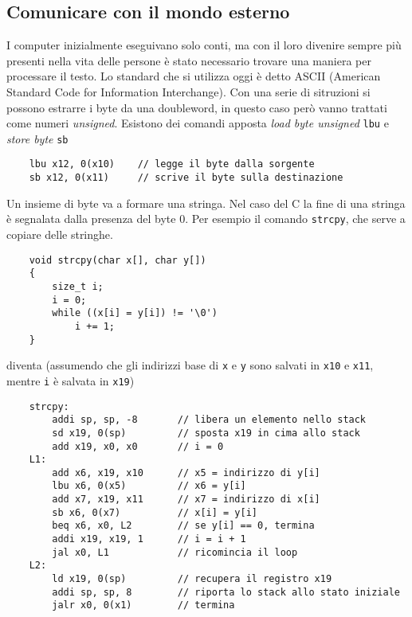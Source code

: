 \documentclass[a4paper,12pt]{article}
\theoremstyle{break}
\newcommand{\code}[1]{\texttt{#1}}
\numberwithin{equation}{section}
\begin{document}
\subsection{Comunicare con il mondo esterno}
I computer inizialmente eseguivano solo conti, ma con il loro divenire sempre più presenti nella vita delle persone è stato necessario trovare una maniera per processare il testo. Lo standard che si utilizza oggi è detto ASCII (American Standard Code for Information Interchange). Con una serie di sitruzioni si possono estrarre i byte da una doubleword, in questo caso però vanno trattati come numeri \textit{unsigned}. Esistono dei comandi apposta \textit{load byte unsigned} \code{lbu} e \textit{store byte} \code{sb}
\begin{verbatim}
    lbu x12, 0(x10)    // legge il byte dalla sorgente
    sb x12, 0(x11)     // scrive il byte sulla destinazione
\end{verbatim}
Un insieme di byte va a formare una stringa. Nel caso del C la fine di una stringa è segnalata dalla presenza del byte \(0\). 
Per esempio il comando \code{strcpy}, che serve a copiare delle stringhe.
\begin{verbatim}
    void strcpy(char x[], char y[])
    {
        size_t i;
        i = 0;
        while ((x[i] = y[i]) != '\0')
            i += 1;
    }
\end{verbatim}
diventa (assumendo che gli indirizzi base di \code{x} e \code{y} sono salvati in \code{x10} e \code{x11}, mentre \code{i} è salvata in \code{x19})
\begin{verbatim}
    strcpy:
        addi sp, sp, -8       // libera un elemento nello stack
        sd x19, 0(sp)         // sposta x19 in cima allo stack
        add x19, x0, x0       // i = 0
    L1:
        add x6, x19, x10      // x5 = indirizzo di y[i]
        lbu x6, 0(x5)         // x6 = y[i]
        add x7, x19, x11      // x7 = indirizzo di x[i]
        sb x6, 0(x7)          // x[i] = y[i]
        beq x6, x0, L2        // se y[i] == 0, termina
        addi x19, x19, 1      // i = i + 1
        jal x0, L1            // ricomincia il loop
    L2: 
        ld x19, 0(sp)         // recupera il registro x19
        addi sp, sp, 8        // riporta lo stack allo stato iniziale
        jalr x0, 0(x1)        // termina
\end{verbatim}
\end{document}
